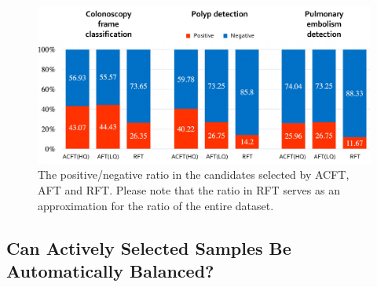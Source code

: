 \begin{figure}[t]
\begin{center}
\includegraphics[width=0.9\linewidth]{Figures/CH3/fig_balance_ratio.pdf}
\end{center}
\caption[Positive/Negative Ratios of Selected Candidates]{
The positive/negative ratio in the candidates selected by ACFT, AFT and RFT. Please note that the ratio in RFT serves as an approximation for the ratio of the entire dataset.}
\label{ch3:fig:balance_ratio}
\end{figure}

\subsection{Can Actively Selected Samples Be Automatically Balanced?}
\label{ch3:discussion_conclusion:samples_automatically_balanced}

